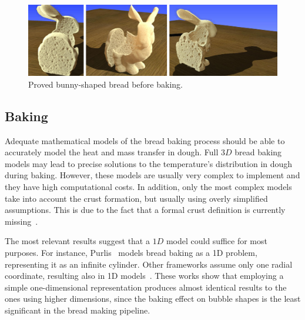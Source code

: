 \documentclass[spanish,a4paper,11pt,oneside,links]{report}
\begin{document}
\begin{figure}
\includegraphics[width=19cm]{figures/prebakebunny}
\caption{Proved bunny-shaped bread before baking.}
\label{fg:provingBunny}
\end{figure}

\subsection{Baking}
Adequate mathematical models of the bread baking process should be able to accurately model the heat and mass transfer in dough.
Full $3D$ bread baking models may lead to precise solutions to the temperature's distribution in dough during baking.
However, these models are usually very complex to implement and they have high computational costs.
In addition, only the most complex models take into account the crust formation, but usually using overly simplified assumptions.
This is due to the fact that a formal crust definition is currently missing~\cite{Vanin2009}.

The most relevant results suggest that a $1D$ model could suffice for most purposes. 
For instance, Purlis~\cite{Purlis2011} models bread baking as a 1D problem, representing it as an infinite cylinder.
Other frameworks assume only one radial coordinate, resulting also in 1D models~\cite{Powathil2004, Thorvaldsson1999}.  
These works show that employing a simple one-dimensional representation produces almost identical results to the ones using higher dimensions, since the baking effect on bubble shapes is the least significant in the bread making pipeline. 
\end{document}
